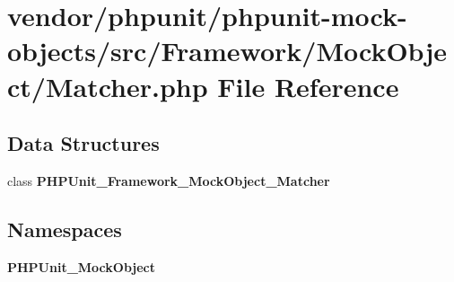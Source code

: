 \section{vendor/phpunit/phpunit-\/mock-\/objects/src/\+Framework/\+Mock\+Object/\+Matcher.php File Reference}
\label{_matcher_8php}
\subsection*{Data Structures}
\begin{DoxyCompactItemize}
\item 
class {\bf P\+H\+P\+Unit\+\_\+\+Framework\+\_\+\+Mock\+Object\+\_\+\+Matcher}
\end{DoxyCompactItemize}
\subsection*{Namespaces}
\begin{DoxyCompactItemize}
\item 
 {\bf P\+H\+P\+Unit\+\_\+\+Mock\+Object}
\end{DoxyCompactItemize}
